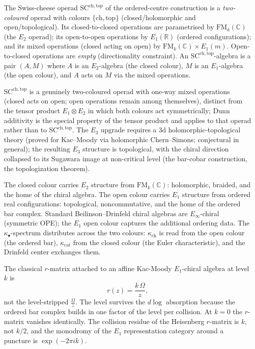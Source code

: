 \begin{definition}
\label{def:swiss-cheese-split}
The Swiss-cheese operad $\mathrm{SC}^{\mathrm{ch},\mathrm{top}}$
of the ordered-centre construction is a \emph{two-coloured} operad with colours
$\{\mathrm{ch}, \mathrm{top}\}$ (closed/holomorphic and
open/topological). Its closed-to-closed operations are
parametrised by $\mathrm{FM}_k(\mathbb{C})$ (the $E_2$ operad);
its open-to-open operations by $E_1(\mathbb{R})$ (ordered
configurations); and its mixed operations (closed acting on
open) by $\mathrm{FM}_k(\mathbb{C}) \times E_1(m)$.
Open-to-closed operations are \emph{empty} (directionality
constraint). An $\mathrm{SC}^{\mathrm{ch},\mathrm{top}}$-algebra
is a pair $(A, M)$ where $A$ is an $E_2$-algebra (the closed
colour), $M$ is an $E_1$-algebra (the open colour), and $A$
acts on $M$ via the mixed operations.

$\mathrm{SC}^{\mathrm{ch},\mathrm{top}}$ is a genuinely two-coloured
operad with one-way mixed operations (closed acts on open; open
operations remain among themselves), distinct from the tensor product
$E_1 \otimes E_2$ in which both colours act symmetrically; Dunn
additivity is the special property of the tensor product and applies
to that operad rather than to $\mathrm{SC}^{\mathrm{ch},\mathrm{top}}$.
The $E_3$ upgrade requires a 3d holomorphic-topological theory
(proved for Kac--Moody via holomorphic Chern--Simons; conjectural in
general); the resulting $E_3$ structure is topological, with the
chiral direction collapsed to its Sugawara image at non-critical level
(the bar-cobar construction, the topologization theorem).
\end{definition}

The closed colour carries $E_2$ structure from
$\mathrm{FM}_k(\mathbb{C})$: holomorphic, braided, and the
home of the chiral algebra. The open colour carries $E_1$
structure from ordered real configurations: topological,
noncommutative, and the home of the ordered bar complex.
Standard Beilinson--Drinfeld chiral algebras are
$E_\infty$-chiral (symmetric OPE); the $E_1$ open colour
captures the additional ordering data. The
$\kappa_\bullet$-spectrum distributes across the two
colours: $\kappa_{\mathrm{ch}}$ is read from the open colour
(the ordered bar), $\kappa_{\mathrm{cat}}$ from the closed
colour (the Euler characteristic), and the Drinfeld center
exchanges them.

\begin{remark}
\label{rem:level-prefixed-r-matrix}
The classical $r$-matrix attached to an affine Kac-Moody $E_1$-chiral algebra at level $k$ is
\[
 r(z) = \frac{k\,\Omega}{z},
\]
not the level-stripped $\frac{\Omega}{z}$. The level survives the $d\log$ absorption because the ordered bar complex builds in one factor of the level per collision. At $k=0$ the $r$-matrix vanishes identically. The collision residue of the Heisenberg $r$-matrix is $k$, not $k/2$, and the monodromy of the $E_1$ representation category around a puncture is $\exp(-2\pi i k)$.
\end{remark}

